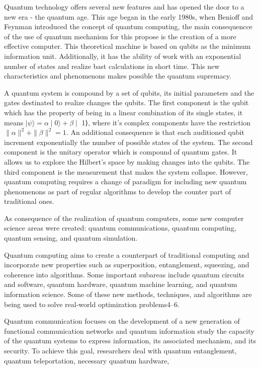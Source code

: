 \documentclass[12pt]{article}
\begin{document}
	{Quantum technology offers several new features and has opened the door to a new era - the quantum age. This age began in the early 1980s, when Benioff and Feynman introduced the concept of quantum computing, the main consequencce of the use of quantum mechanism for this propose is the creation of a more effective computer. This theoretical machine is based on qubits as the minimum information unit. Additionally, it has the ability of work with an exponential number of states and realize bast calculations in short time. This new characteristics and phenomenons makes possible the quantum supremacy.\par
	A quantum system is compound by a set of qubits, its initial parameters and the gates destinated to realize changes the qubits. The first component is the qubit which has the property of being in a linear combination of its single states, it means $\mid \psi⟩ = \alpha \mid 0⟩+\beta \mid$ 1⟩, where it’s complex components have the restriction $\parallel \alpha \parallel^2 +\parallel \beta \parallel^2 = 1$. An additional consequence is that
	each auditioned qubit increment exponentially the number of possible states of the system. The second component is the unitary
	operator which is compound of quantum gates. It allows us to explore the Hilbert’s space by making changes into the qubits.
	The third component is the measurement that makes the system collapse. However, quantum computing requires a change of
	paradigm for including new quantum phenomenons as part of regular algorithms to develop the counter part of traditional ones.\par
	As consequence of the realization of quantum computers, some new computer science areas were created: quantum
	communications, quantum computing, quantum sensing, and quantum simulation.\par
	Quantum computing aims to create a counterpart of traditional computing and incorporate new properties such as superposition, entanglement, squeezing, and coherence into algorithms. Some important subareas include quantum circuits and software,
	quantum hardware, quantum machine learning, and quantum information science. Some of these new methods, techniques, and
	algorithms are being used to solve real-world optimization problems4–6.\par
	Quantum communication focuses on the development of a new generation of functional communication networks and
	quantum information study the capacity of the quantum systems to express information, its associated mechanism, and its
	security. To achieve this goal, researchers deal with quantum entanglement, quantum teleportation, necessary quantum hardware,
}
\end{document}
